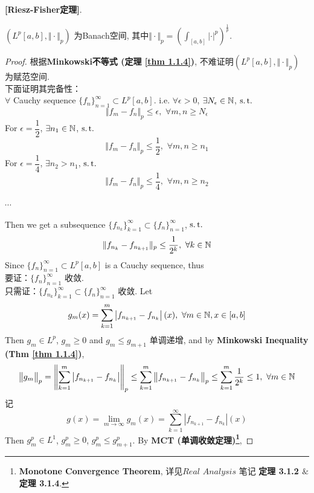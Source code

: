 	\begin{thm}\label{thm 2.1.1}
		\textbf{[Riesz-Fisher定理]}. 
		\begin{center}
			$(L^{p}[a , b] , \Vert \cdot \Vert_p)$ 为Banach空间, 其中$\Vert \cdot \Vert_p = \left( \int_{[a , b]} \left| \cdot \right|^p \right)^{\tfrac{1}{p}}$. 
		\end{center}
		
		\vspace{6em}
		
		\begin{proof}
			根据\textbf{Minkowski不等式 (定理 \ref{thm 1.1.4})}, 不难证明$(L^{p}[a,  b] , \Vert \cdot \Vert_{p})$ 为赋范空间. \\
			下面证明其完备性：\\
			$\forall$ Cauchy sequence $\{ f_n \}_{n = 1}^{\infty} \subset L^{p}[a , b]$. i.e. $\forall \epsilon > 0$, $\exists N_\epsilon \in \mathbb{N}$, $\operatorname{s.t.}$
			\[ \Vert f_m - f_n \Vert_{p} \leq \epsilon , \,\, \forall m , n \geq N_\epsilon \]
			For $\epsilon = \dfrac{1}{2}$, $\exists n_1 \in \mathbb{N}$, $\operatorname{s.t.}$
			\[ \Vert f_m - f_n \Vert_{p} \leq \frac{1}{2} , \,\, \forall m , n \geq n_1 \]
			For $\epsilon = \dfrac{1}{4}$, $\exists n_2 > n_1$, $\operatorname{s.t.}$
			\[ \Vert f_m - f_n \Vert_{p} \leq \frac{1}{4} , \,\, \forall m , n \geq n_2 \]
			\begin{center}
				$\cdots$
			\end{center}
			Then we get a subsequence $\{ f_{n_k} \}_{k = 1}^{\infty} \subset \{ f_n \}_{n = 1}^{\infty}$, $\operatorname{s.t.}$
			\[ \Vert f_{n_k} - f_{n_{k + 1}} \Vert_p \leq \frac{1}{2^k} , \,\, \forall k \in \mathbb{N} \]
			Since $\{ f_n \}_{n = 1}^{\infty} \subset L^{p}[a , b]$ is a Cauchy sequence, thus \\
			要证：$\{ f_n \}_{n = 1}^{\infty}$ 收敛. \\
			只需证：$\{ f_{n_k} \}_{k = 1}^{\infty} \subset \{ f_n \}_{n = 1}^{\infty}$ 收敛. Let
			\[ g_{m}(x) = \sum_{k = 1}^{m} \left| f_{n_{k + 1}} - f_{n_k} \right| (x) , \,\, \forall m \in \mathbb{N} , x \in [a , b] \]
			Then $g_m \in L^p$, $g_m \geq 0$ and $g_{m} \leq g_{m + 1}$ 单调递增, and by \textbf{Minkowski Inequality (Thm \ref{thm 1.1.4})}, 
			\[ \big\Vert g_{m} \big\Vert_p 
			= \left\Vert \sum_{k = 1}^m \left| f_{n_{k + 1}} - f_{n_k} \right| \right\Vert_p 
			\leq \sum_{k = 1}^m \left\Vert f_{n_{k + 1}} - f_{n_k} \right\Vert_p
			\leq \sum_{k = 1}^{m} \frac{1}{2^k} 
			\leq 1 , \,\, \forall m \in \mathbb{N} \]
			记
			\[ g(x) = \lim_{m \to \infty} g_{m}(x) = \sum_{k = 1}^{\infty} \left| f_{n_{k + 1}} - f_{n_k} \right| (x) \]
			Then $g_{m}^p \in L^1$, $g_{m}^p \geq 0$, $g_{m}^p \leq g_{m + 1}^p$. By \textbf{MCT (单调收敛定理)\footnote{\textbf{Monotone Convergence Theorem}, 详见$Real \,\, Analysis$ 笔记 \textbf{定理 3.1.2 $\&$ 定理 3.1.4}.}}, 

\end{proof}
\end{thm}
